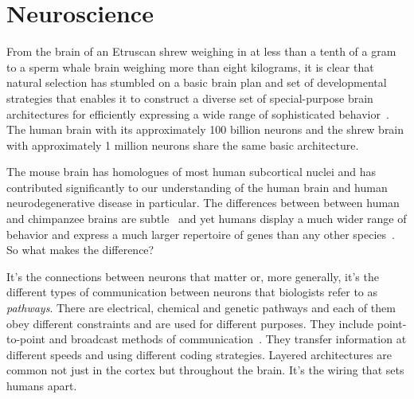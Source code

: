\documentclass[letterpaper,11pt]{article}
\begin{document}



\section{Neuroscience}
\label{section_neuroscience}


From the brain of an Etruscan shrew weighing in at less than a tenth of a gram to a sperm whale brain weighing more than eight kilograms, it is clear that natural selection has stumbled on a basic brain plan and set of developmental strategies that enables it to construct a diverse set of special-purpose brain architectures for efficiently expressing a wide range of sophisticated behavior~\cite{DouglasandMartinCURRENT-BIOLOGY-12,WillemetBRAIN-SCIENCE-12}. The human brain with its approximately 100 billion neurons and the shrew brain with approximately 1 million neurons share the same basic architecture.

The mouse brain has homologues of most human subcortical nuclei and has contributed significantly to our understanding of the human brain and human neurodegenerative disease in particular. The differences between between human and chimpanzee brains are subtle~\cite{Mora-BermudezetalELIFE-16} and yet humans display a much wider range of behavior and express a much larger repertoire of genes than any other species~\cite{HawrylyczetalNATURE-NEUROSCIENCE-15}. So what makes the difference?

It's the connections between neurons that matter or, more generally, it's the different types of communication between neurons that biologists refer to as {\it{pathways}}. There are electrical, chemical and genetic pathways and each of them obey different constraints and are used for different purposes. They include point-to-point and broadcast methods of communication~\cite{HanetalNATURE-18}. They transfer information at different speeds and using different coding strategies. Layered architectures are common not just in the cortex but throughout the brain. It's the wiring that sets humans apart.

\end{document}
